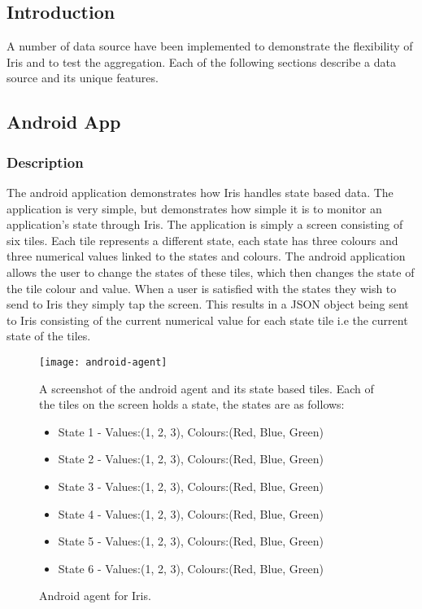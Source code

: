 \documentclass[12pt,a4paper,titlepage]{report}
\begin{document}
\subsection{Introduction}
A number of data source have been implemented to demonstrate the flexibility of Iris and to test the aggregation. Each
of the following sections describe a data source and its unique features.

\subsection{Android App}
\subsubsection{Description}
The android application demonstrates how Iris handles state based data. The application is very simple, but demonstrates how simple it is to monitor an application's state through Iris. The application is simply a screen consisting of six tiles. Each tile represents a different state, each state has three colours and three numerical values linked to the states and colours. The android application allows the user to change the states of these tiles, which then changes the state of the tile colour and value. When a user is satisfied with the states they wish to send to Iris they simply tap the screen. This results in a JSON object being sent to Iris consisting of the current numerical value for each state tile i.e the current state of the tiles.
\begin{figure}[H]
\begin{tcolorbox}
\begin{center}
\texttt{[image: android-agent]}
\end{center}
A screenshot of the android agent and its state based tiles. Each of the tiles on the screen holds a state, the states are as follows:
\begin{itemize}
    \item State 1 - Values:(1, 2, 3), Colours:(Red, Blue, Green)
    \item State 2 - Values:(1, 2, 3), Colours:(Red, Blue, Green) 
    \item State 3 - Values:(1, 2, 3), Colours:(Red, Blue, Green) 
    \item State 4 - Values:(1, 2, 3), Colours:(Red, Blue, Green) 
    \item State 5 - Values:(1, 2, 3), Colours:(Red, Blue, Green) 
    \item State 6 - Values:(1, 2, 3), Colours:(Red, Blue, Green) 
\end{itemize}
\end{tcolorbox}
\caption{Android agent for Iris.}
\end{figure}
\end{document}
